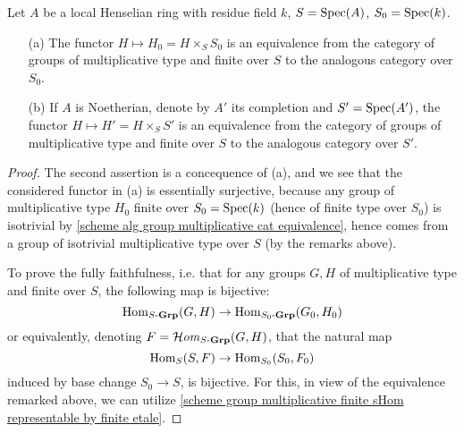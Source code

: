 \begin{lemma}\label{scheme group multiplicative over Hensel reduction}
Let $A$ be a local Henselian ring with residue field $k$, $S=\mathrm{Spec}(A)$, $S_0=\mathrm{Spec}(k)$.
\begin{enumerate}
    \item[(a)] The functor $H\mapsto H_0=H\times_SS_0$ is an equivalence from the category of groups of multiplicative type and finite over $S$ to the analogous category over $S_0$.
    \item[(b)] If $A$ is Noetherian, denote by $A'$ its completion and $S'=\mathrm{Spec}(A')$, the functor $H\mapsto H'=H\times_SS'$ is an equivalence from the category of groups of multiplicative type and finite over $S$ to the analogous category over $S'$.
\end{enumerate}
\end{lemma}
\begin{proof}
The second assertion is a concequence of (a), and we see that the considered functor in (a) is essentially surjective, because any group of multiplicative type $H_0$ finite over $S_0=\mathrm{Spec}(k)$ (hence of finite type over $S_0$) is isotrivial by \cref{scheme alg group multiplicative cat equivalence}, hence comes from a group of isotrivial multiplicative type over $S$ (by the remarks above).\par
To prove the fully faithfulness, i.e. that for any groups $G,H$ of multiplicative type and finite over $S$, the following map is bijective:
\[\mathrm{Hom}_{S\textup{-}\mathbf{Grp}}(G,H)\to\mathrm{Hom}_{S_0\textup{-}\mathbf{Grp}}(G_0,H_0)\]
or equivalently, denoting $F=\operatorname{\mathcal{H}\hspace*{-0.4pt}\textit{om}\hspace{0.5pt}}_{S\textup{-}\mathbf{Grp}}(G,H)$, that the natural map
\[\mathrm{Hom}_S(S,F)\to\mathrm{Hom}_{S_0}(S_0,F_0)\]
induced by base change $S_0\to S$, is bijective. For this, in view of the equivalence remarked above, we can utilize \cref{scheme group multiplicative finite sHom representable by finite etale}.
\end{proof}

